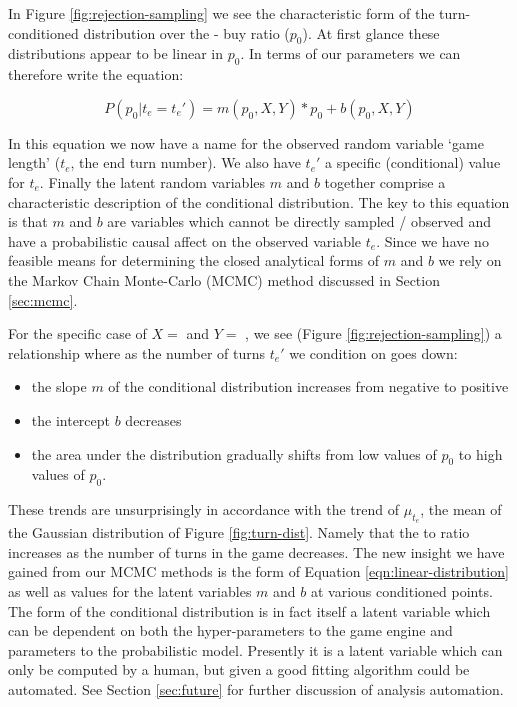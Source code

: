 In Figure \ref{fig:rejection-sampling} we see the characteristic
form of the turn-conditioned distribution over the
 -  buy ratio ($p_0$). At first glance
these distributions appear to be linear in $p_0$. In terms of our
parameters we can therefore write the equation:

\begin{equation} \label{eqn:linear-distribution}
P(p_0 | t_e = t_e') = m(p_0, X, Y) * p_0 + b(p_0, X, Y)
\end{equation}

In this equation we now have a name for the observed random variable
`game length' ($t_e$, the end turn number).
We also have $t_e'$ a specific (conditional) value for $t_e$.
Finally the latent random variables $m$ and $b$ together comprise a
characteristic description of the conditional distribution. The
key to this equation is that $m$ and $b$ are variables which cannot
be directly sampled / observed and have a probabilistic causal affect
on the observed variable $t_e$.
Since we have no feasible means for determining the closed analytical
forms of $m$ and $b$ we rely on the Markov Chain Monte-Carlo (MCMC)
method discussed  in Section \ref{sec:mcmc}.

For the specific case of $X =$  and $Y =$ ,
we see (Figure \ref{fig:rejection-sampling}) a relationship where as the
number of turns $t_e'$ we condition on goes down:

\begin{itemize}
\item the slope $m$ of the conditional distribution increases from negative to positive
\item the intercept $b$ decreases
\item the area under the distribution gradually shifts from low values of $p_0$ to
      high values of $p_0$.
\end{itemize}

These trends are unsurprisingly in accordance with the trend of $\mu_{t_e}$,
the mean of the Gaussian distribution of Figure \ref{fig:turn-dist}. Namely
that the  to  ratio increases as the number of
turns in the game decreases. The new insight we have gained from our MCMC
methods is the form of Equation \ref{eqn:linear-distribution} as well as values
for the latent variables $m$ and $b$ at various conditioned points. The form
of the conditional distribution is in fact itself a latent variable which
can be dependent on both the hyper-parameters to the game engine and parameters
to the probabilistic model. Presently it is a latent variable which can only be
computed by a human, but given a good fitting algorithm could be automated.
See Section \ref{sec:future} for further discussion of analysis automation.

